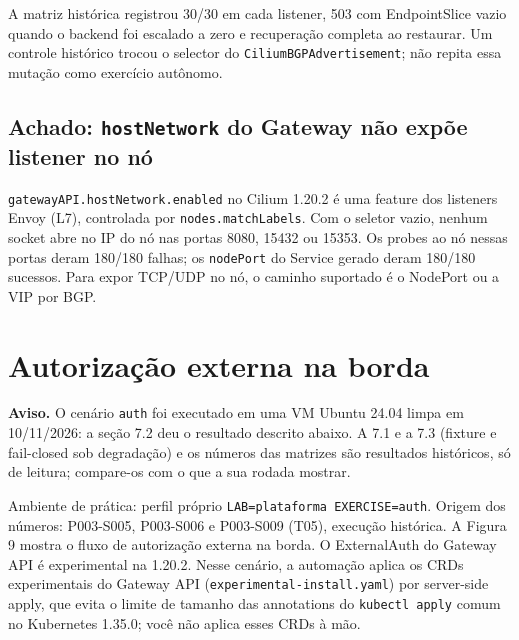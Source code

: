 \documentclass[12pt,openany,oneside,a4paper,chapter=TITLE,english,brazil]{abntex2}
\begin{document}
A matriz histórica registrou 30/30 em cada listener, 503 com
EndpointSlice vazio quando o backend foi escalado a zero e recuperação
completa ao restaurar. Um controle histórico trocou o selector do
\texttt{Cilium\allowbreak{}BGPAdvertisement}; não repita essa mutação como exercício autônomo.

\section{\texorpdfstring{Achado: \texttt{host\allowbreak{}Network} do Gateway não expõe listener no nó}{Achado:  do Gateway não expõe listener no nó}}\label{achado-hostnetwork-do-gateway-nuxe3o-expuxf5e-listener-no-nuxf3}

\texttt{gateway\allowbreak{}API.\allowbreak{}host\allowbreak{}Network.\allowbreak{}enabled} no Cilium 1.20.2 é uma feature dos listeners
Envoy (L7), controlada por \texttt{nodes.\allowbreak{}match\allowbreak{}Labels}. Com o seletor vazio, nenhum
socket abre no IP do nó nas portas 8080, 15432 ou 15353. Os probes ao nó
nessas portas deram 180/180 falhas; os \texttt{node\allowbreak{}Port} do Service gerado deram
180/180 sucessos. Para expor TCP/UDP no nó, o caminho suportado é o NodePort
ou a VIP por BGP.

\chapter{Autorização externa na borda}\label{autorizauxe7uxe3o-externa-na-borda}

\begin{mdframed}[linewidth=0.6pt,innertopmargin=6pt,innerbottommargin=6pt]
\small
\textbf{Aviso.} O cenário \texttt{auth} foi executado em uma VM Ubuntu
24.04 limpa em 10/11/2026: a seção 7.2 deu o resultado descrito abaixo.
A 7.1 e a 7.3 (fixture e fail-closed sob degradação) e os números das
matrizes são resultados históricos, só de leitura; compare-os com o que
a sua rodada mostrar.
\end{mdframed}

Ambiente de prática: perfil próprio \texttt{LAB=\allowbreak{}plataforma EXERCISE=\allowbreak{}auth}. Origem
dos números: P003-S005, P003-S006 e P003-S009 (T05), execução histórica. A
Figura 9 mostra o fluxo de autorização externa na borda.
O ExternalAuth do Gateway API é experimental na 1.20.2. Nesse cenário, a
automação aplica os CRDs experimentais do Gateway API (\texttt{experimental-{}\allowbreak{}install.\allowbreak{}yaml})
por server-side apply, que evita o limite de tamanho das annotations do
\texttt{kubectl apply} comum no Kubernetes 1.35.0; você não aplica esses CRDs à mão.
\end{document}
